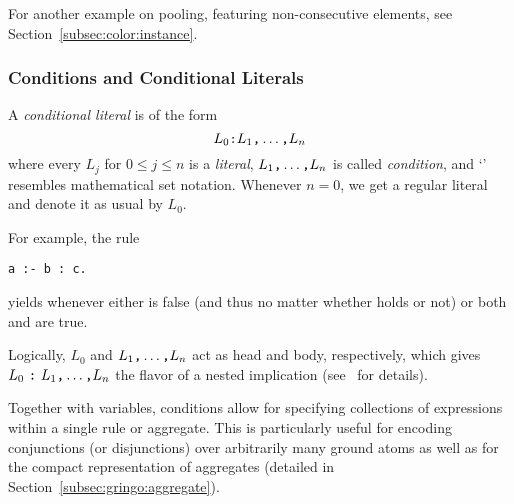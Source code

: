 For another example on pooling, featuring non-consecutive elements, see Section~\ref{subsec:color:instance}.

\subsubsection{Conditions and Conditional Literals}\label{subsec:gringo:condition}
%
%
%
A \emph{conditional literal} is of the form
\[L_0\texttt{:}L_1\texttt{,}\dots\texttt{,}L_n\]
%
where every $L_j$ for $0\leq j\leq n$ is a \emph{literal},
$L_1\text{\texttt{,}}\dots\text{\texttt{,}}L_n$ is called \textit{condition},
and `\code{:}' resembles mathematical set notation.
Whenever $n=0$, we get a regular literal and denote it as usual by $L_0$.

For example, the rule
\begin{lstlisting}[numbers=none]
a :- b : c.
\end{lstlisting}
yields  whenever either  is false (and thus no matter whether  holds or not) or both  and  are true.

\begin{note}
Logically, $L_0$ and $L_1\text{\texttt{,}}\dots\text{\texttt{,}}L_n$ act as
head and body, respectively,
which gives $L_0~\texttt{:}~L_1\text{\texttt{,}}\dots\text{\texttt{,}}L_n$ 
the flavor of a nested implication
(see~\cite{haliya14a} for details).
\end{note}

Together with variables,
conditions allow for specifying collections of expressions within a single rule or aggregate.
This is particularly useful for encoding conjunctions (or disjunctions) over
arbitrarily many ground atoms as well as for the compact representation of aggregates
(detailed in Section~\ref{subsec:gringo:aggregate}).

